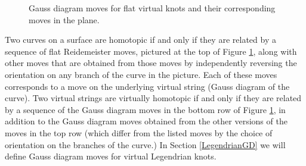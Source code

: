 \begin{figure}[htbp]
\centering
{}
\label{fig:subfigureExample}

\label{fig:subfigureExample}

\caption{Gauss diagram moves for flat virtual knots and their corresponding moves in the plane.}
\label{flatmoves.fig}
\end{figure}
Two curves on a surface are homotopic if and only if they are related by a sequence of flat Reidemeister moves, pictured at the top of Figure \ref{flatmoves.fig}, along with other moves that are obtained from those moves by independently reversing the orientation on any branch of the curve in the picture.  Each of these moves corresponds to a move on the underlying virtual string (Gauss diagram of the curve).  Two virtual strings are virtually homotopic if and only if they are related by a sequence of the Gauss diagram moves in the bottom row of Figure \ref{flatmoves.fig}, in addition to the Gauss diagram moves obtained from the other versions of the moves in the top row (which differ from the listed moves by the choice of orientation on the branches of the curve.)  In Section \ref{LegendrianGD} we will define Gauss diagram moves for virtual Legendrian knots.

